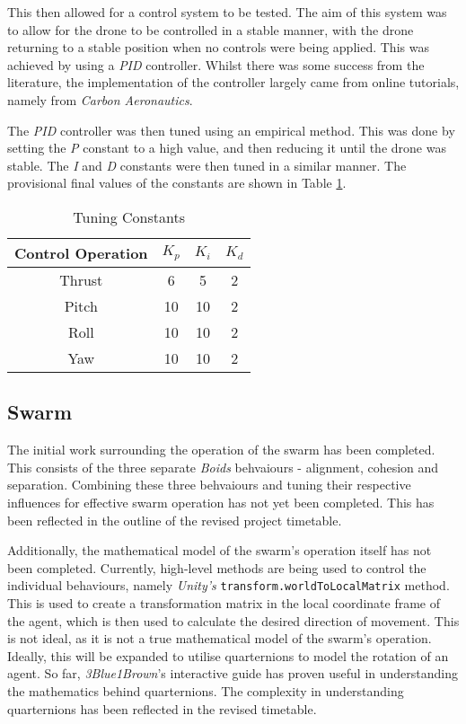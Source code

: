 \documentclass{article}
\begin{document}
This then allowed for a control system to be tested. The aim of this system was to allow for the drone to be controlled in a stable manner, with the drone returning to a stable position when no controls were being applied. This was achieved by using a \emph{PID} controller\cite[p72-73]{Szafranski}. Whilst there was some success from the literature, the implementation of the controller largely came from online tutorials, namely from \emph{Carbon Aeronautics}\cite{Carbon}.


The \emph{PID} controller was then tuned using an empirical method. This was done by setting the \emph{P} constant to a high value, and then reducing it until the drone was stable. The \emph{I} and \emph{D} constants were then tuned in a similar manner. The provisional final values of the constants are shown in Table \ref{tab:pid-constants}.

\begin{table}[H]
    \centering
    \begin{tabular}{| c | c | c | c |} 
    \hline
    Control Operation & $K_p$ & $K_i$ & $K_d$ \\ 
    \hline
    Thrust & 6 & 5 & 2 \\
    \hline
    Pitch & 10 & 10 & 2 \\
    \hline
    Roll & 10 & 10 & 2 \\
    \hline
    Yaw & 10 & 10 & 2 \\
    \hline
    \end{tabular}
    \caption{Tuning Constants}
    \label{tab:pid-constants}
\end{table}


\subsection{Swarm}

The initial work surrounding the operation of the swarm has been completed. This consists of the three separate \emph{Boids} behvaiours - alignment, cohesion and separation\cite{Reynolds}. Combining these three behvaiours and tuning their respective influences for effective swarm operation has not yet been completed. This has been reflected in the outline of the revised project timetable.

Additionally, the mathematical model of the swarm's operation itself has not been completed. Currently, high-level methods are being used to control the individual behaviours, namely \emph{Unity's} \verb|transform.worldToLocalMatrix| method. This is used to create a transformation matrix in the local coordinate frame of the agent, which is then used to calculate the desired direction of movement. This is not ideal, as it is not a true mathematical model of the swarm's operation. Ideally, this will be expanded to utilise quarternions to model the rotation of an agent. So far, \emph{3Blue1Brown}'s interactive guide has proven useful in understanding the mathematics behind quarternions\cite{3Blue1Brown}. The complexity in understanding quarternions has been reflected in the revised timetable.
\end{document}

